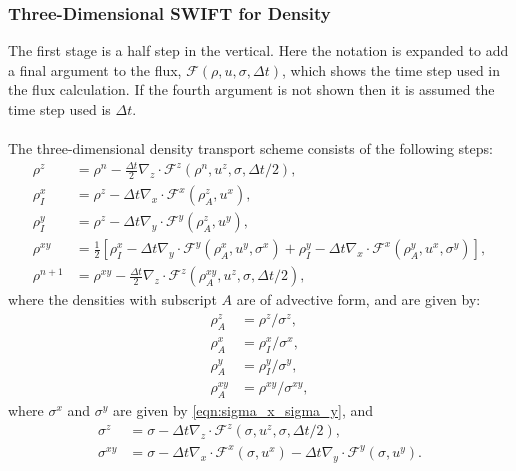 \documentclass[11pt,a4paper]{article}
\begin{document}
\subsubsection{Three-Dimensional SWIFT for Density} \label{sec:3D_density}
The first stage is a half step in the vertical.
Here the notation is expanded to add a final argument to the flux, $\mathcal{F}(\rho,u,\sigma,\Delta{t})$, which shows the time step used in the flux calculation. If the fourth argument is not shown then it is assumed the time step used is $\Delta{t}$. \\
\\
The three-dimensional density transport scheme consists of the following steps:
\begin{subequations}
\begin{align}
\rho^z & = \rho^n - \tfrac{\Delta t}{2}\nabla_z \cdot \mathcal{F}^z\left(\rho^n, u^z, \sigma, \Delta t /2 \right), \\
\rho_I^x & = \rho^z - \Delta t \nabla_x \cdot \mathcal{F}^x\left(\rho^z_A, u^x \right), \\
\rho_I^y & = \rho^z - \Delta t \nabla_y \cdot \mathcal{F}^y\left(\rho^z_A, u^y \right), \\
\rho^{xy} & = \frac{1}{2}\left[\rho_I^x - \Delta t \nabla_y \cdot \mathcal{F}^y\left(\rho^x_A, u^y, \sigma^x \right) + \rho_I^y - \Delta t \nabla_x \cdot \mathcal{F}^x\left(\rho_A^y, u^x,\sigma^y\right)\right], \\
\rho^{n+1} & = \rho^{xy} - \tfrac{\Delta t}{2}\nabla_z\cdot\mathcal{F}^z\left(\rho_A^{xy},u^z,\sigma,\Delta t/2\right),
\end{align}
\end{subequations}
where the densities with subscript $A$ are of advective form, and are given by:
\begin{subequations}
\begin{align}
\rho^z_A & = \rho^z / \sigma^z, \\
\rho^x_A & = \rho_I^x / \sigma^x, \\
\rho^y_A & = \rho_I^y / \sigma^y, \\
\rho^{xy}_A & = \rho^{xy} / \sigma^{xy},
\end{align}
\end{subequations}
where $\sigma^x$ and $\sigma^y$ are given by \eqref{eqn:sigma_x_sigma_y}, and
\begin{subequations}
\begin{align}
\sigma^z & = \sigma - \Delta t \nabla_z \cdot \mathcal{F}^z(\sigma,u^z,\sigma,\Delta{t}/2), \\
\sigma^{xy} & = \sigma - \Delta{t} \nabla_x \cdot \mathcal{F}^x(\sigma,u^x) - \Delta{t} \nabla_y \cdot \mathcal{F}^y(\sigma,u^y).
\end{align}
\end{subequations}
\end{document}
